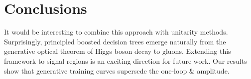 \section{Conclusions}\label{sec:conclusions}

It would be interesting to combine this approach with unitarity methods.
Surprisingly, principled boosted decision trees emerge naturally from
the generative optical theorem of Higgs boson decay to gluons. Extending
this framework to signal regions is an exciting direction for future
work. Our results show that generative training curves supersede the
one-loop & amplitude.

